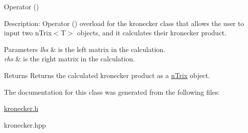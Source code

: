 Operator () 

Description\+: Operator () overload for the kronecker class that allows the user to input two n\+Trix$<$\+T$>$ objects, and it calculates their kronecker product. 
\begin{DoxyParams}{Parameters}
{\em lhs} & is the left matrix in the calculation. \\
\hline
{\em rhs} & is the right matrix in the calculation. \\
\hline
\end{DoxyParams}
\begin{DoxyReturn}{Returns}
Returns the calculated kronecker product as a \hyperlink{classnTrix}{n\+Trix} object. 
\end{DoxyReturn}


The documentation for this class was generated from the following files\+:\begin{DoxyCompactItemize}
\item 
\hyperlink{kronecker_8h}{kronecker.\+h}\item 
kronecker.\+hpp\end{DoxyCompactItemize}
